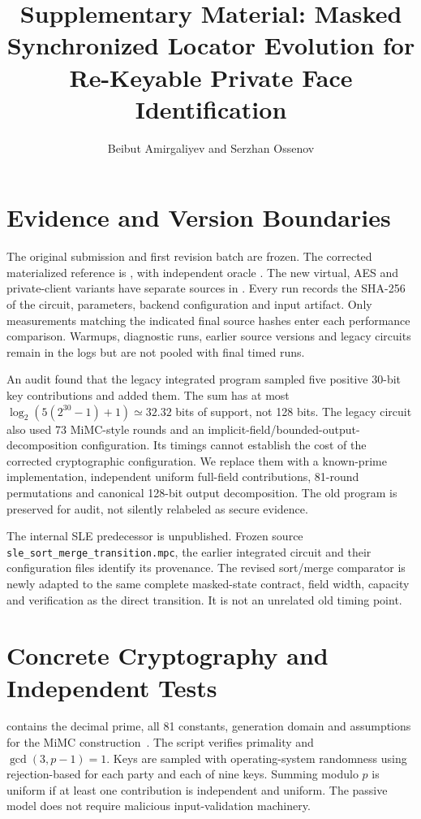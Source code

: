 \documentclass[journal,onecolumn]{IEEEtran}
\begin{document}
\title{Supplementary Material: Masked Synchronized Locator Evolution for Re-Keyable Private Face Identification}
\author{Beibut Amirgaliyev and Serzhan Ossenov}\maketitle

\section{Evidence and Version Boundaries}
The original submission and first revision batch are frozen. The corrected materialized reference is , with independent oracle . The new virtual, AES and private-client variants have separate sources in . Every run records the SHA-256 of the circuit, parameters, backend configuration and input artifact. Only measurements matching the indicated final source hashes enter each performance comparison. Warmups, diagnostic runs, earlier source versions and legacy circuits remain in the logs but are not pooled with final timed runs.

An audit found that the legacy integrated program sampled five positive 30-bit key contributions and added them. The sum has at most $\log_2(5(2^{30}-1)+1)\simeq32.32$ bits of support, not 128 bits. The legacy circuit also used 73 MiMC-style rounds and an implicit-field/bounded-output-decomposition configuration. Its timings cannot establish the cost of the corrected cryptographic configuration. We replace them with a known-prime implementation, independent uniform full-field contributions, 81-round permutations and canonical 128-bit output decomposition. The old program is preserved for audit, not silently relabeled as secure evidence.

The internal SLE predecessor is unpublished. Frozen source \texttt{sle\_sort\_merge\_transition.mpc}, the earlier integrated circuit and their configuration files identify its provenance. The revised sort/merge comparator is newly adapted to the same complete masked-state contract, field width, capacity and verification as the direct transition. It is not an unrelated old timing point.

\section{Concrete Cryptography and Independent Tests}
 contains the decimal prime, all 81 constants, generation domain and assumptions for the MiMC construction~\cite{albrecht2016mimc}. The script  verifies primality and $\gcd(3,p-1)=1$. Keys are sampled with operating-system randomness using rejection-based  for each party and each of nine keys. Summing modulo $p$ is uniform if at least one contribution is independent and uniform. The passive model does not require malicious input-validation machinery.
\end{document}
